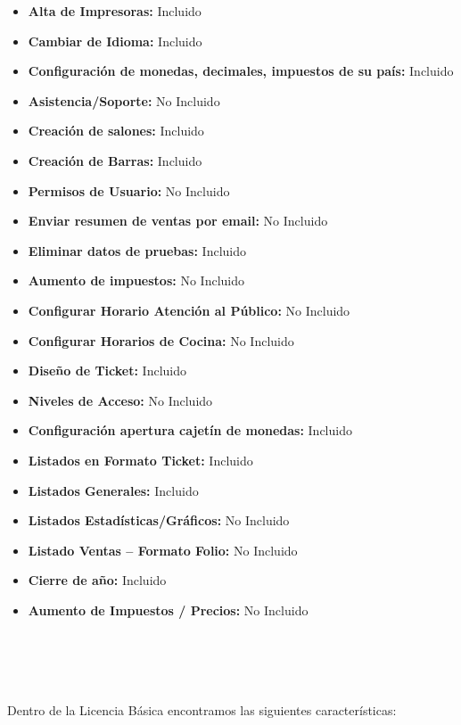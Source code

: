 \documentclass[12pt,a4paper]{article}
\begin{document}
\begin{itemize}
\item \textbf {Alta de Impresoras:} Incluido
\item \textbf {Cambiar de Idioma:} Incluido
\item \textbf {Configuración de monedas, decimales, impuestos de su país:} Incluido
\item \textbf {Asistencia/Soporte:} No Incluido
\item \textbf {Creación de salones:} Incluido
\item \textbf {Creación de Barras:} Incluido
\item \textbf {Permisos de Usuario:} No Incluido
\item \textbf {Enviar resumen de ventas por email:} No Incluido
\item \textbf {Eliminar datos de pruebas:} Incluido

\item \textbf {Aumento de impuestos:} No Incluido
\item \textbf {Configurar Horario Atención al Público:} No Incluido
\item \textbf {Configurar Horarios de Cocina:} No Incluido
\item \textbf {Diseño de Ticket:} Incluido
\item \textbf {Niveles de Acceso:} No Incluido
\item \textbf {Configuración apertura cajetín de monedas:} Incluido
\item \textbf {Listados en Formato Ticket:} Incluido
\item \textbf {Listados Generales:} Incluido
\item \textbf {Listados Estadísticas/Gráficos:} No Incluido
\item \textbf {Listado Ventas – Formato Folio:} No Incluido
\item \textbf {Cierre de año:} Incluido
\item \textbf {Aumento de Impuestos / Precios:} No Incluido\\\\\\\\\\
\end{itemize}

Dentro de la Licencia Básica encontramos las siguientes características:
\end{document}
